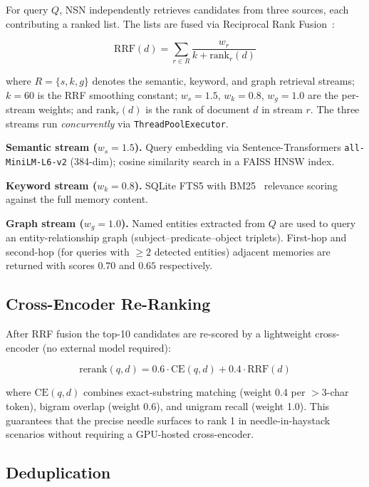 \documentclass[conference]{IEEEtran}
\begin{document}
For query $Q$, NSN independently retrieves candidates from three sources,
each contributing a ranked list.  The lists are fused via Reciprocal Rank
Fusion~\cite{cormack2009rrf}:

\begin{equation}
\text{RRF}(d) = \sum_{r \in R} \frac{w_r}{k + \text{rank}_r(d)}
\label{eq:rrf}
\end{equation}

where $R = \{s, k, g\}$ denotes the semantic, keyword, and graph retrieval
streams; $k = 60$ is the RRF smoothing constant; $w_s = 1.5$, $w_k = 0.8$,
$w_g = 1.0$ are the per-stream weights; and $\text{rank}_r(d)$ is the rank
of document $d$ in stream $r$.  The three streams run \emph{concurrently}
via \texttt{ThreadPoolExecutor}.

\textbf{Semantic stream ($w_s = 1.5$).}
Query embedding via Sentence-Transformers \texttt{all-MiniLM-L6-v2} (384-dim);
cosine similarity search in a FAISS HNSW index.

\textbf{Keyword stream ($w_k = 0.8$).}
SQLite FTS5 with BM25~\cite{robertson2009bm25} relevance scoring against
the full memory content.

\textbf{Graph stream ($w_g = 1.0$).}
Named entities extracted from $Q$ are used to query an entity-relationship
graph (subject--predicate--object triplets).  First-hop and second-hop
(for queries with $\geq 2$ detected entities) adjacent memories are returned
with scores $0.70$ and $0.65$ respectively.

\subsection{Cross-Encoder Re-Ranking}

After RRF fusion the top-10 candidates are re-scored by a lightweight
cross-encoder (no external model required):

\begin{equation}
\text{rerank}(q,d) = 0.6 \cdot \text{CE}(q,d) + 0.4 \cdot \text{RRF}(d)
\label{eq:rerank}
\end{equation}

where $\text{CE}(q,d)$ combines exact-substring matching (weight 0.4 per
$>$3-char token), bigram overlap (weight 0.6), and unigram recall (weight 1.0).
This guarantees that the precise needle surfaces to rank 1 in
needle-in-haystack scenarios without requiring a GPU-hosted cross-encoder.

\subsection{Deduplication}
\end{document}
